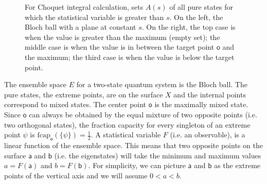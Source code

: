 \documentclass[10pt,twocolumn, nofootinbib]{revtex4-2}
\newcommand\frcap{\mathrm{fcap}}
\newcommand{\ens}[1][e] {\mathsf{#1}} %
\begin{document}
\begin{figure}[H]
	\caption{For Choquet integral calculation, sets $A(s)$ of all pure states for which the statistical variable is greater than $s$. On the left, the Bloch ball with a plane at constant $s$. On the right, the top case is when the value is greater than the maximum (empty set); the middle case is when the value is in between the target point $\ens[o]$ and the maximum; the third case is when the value is below the target point.}
\end{figure}

The ensemble space $E$ for a two-state quantum system is the Bloch ball. The pure states, the extreme points, are on the surface $X$ and the internal points correspond to mixed states. The center point $\ens[o]$ is the maximally mixed state. Since $\ens[o]$ can always be obtained by the equal mixture of two opposite points (i.e. two orthogonal states), the fraction capacity for every singleton of an extreme point $\psi$ is $\frcap_{\ens[o]}(\{\psi\}) =\frac{1}{2}$. A statistical variable $F$ (i.e. an observable), is a linear function of the ensemble space. This means that two opposite points on the surface $\ens[a]$ and $\ens[b]$ (i.e. the eigenstates) will take the minimum and maximum values $a = F(\ens[a])$ and $b = F(\ens[b])$. For simplicity, we can picture $\ens[a]$ and $\ens[b]$ as the extreme points of the vertical axis and we will assume $0<a<b$.
\end{document}
